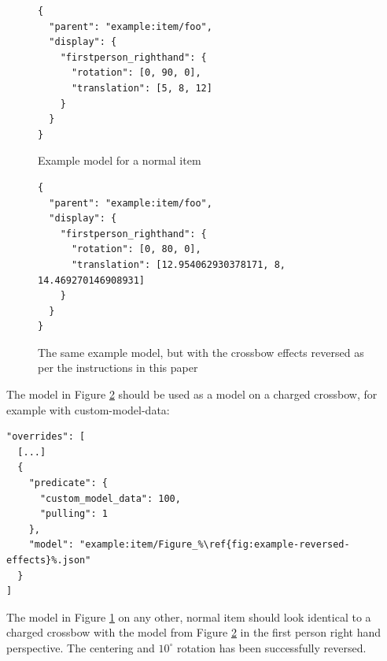 \documentclass{article}
\begin{document}
\begin{figure}[h]
    \centering
    \begin{lstlisting}
{
  "parent": "example:item/foo",
  "display": {
    "firstperson_righthand": {
      "rotation": [0, 90, 0],
      "translation": [5, 8, 12]
    }
  }
}
    \end{lstlisting}
    \caption{Example model for a normal item}
    \label{fig:example-normal}
\end{figure}

\begin{figure}[h]
    \centering
    \begin{lstlisting}
{
  "parent": "example:item/foo",
  "display": {
    "firstperson_righthand": {
      "rotation": [0, 80, 0],
      "translation": [12.954062930378171, 8, 14.469270146908931]
    }
  }
}
    \end{lstlisting}
    \caption{The same example model, but with the crossbow effects reversed as per the instructions in this paper}
    \label{fig:example-reversed-effects}
\end{figure}

The model in Figure \ref{fig:example-reversed-effects} should be used as a model on a charged crossbow, for example with custom-model-data:
\begin{lstlisting}[escapechar=\%]
"overrides": [
  [...]
  {
    "predicate": {
      "custom_model_data": 100,
      "pulling": 1
    },
    "model": "example:item/Figure_%\ref{fig:example-reversed-effects}%.json"
  }
]
\end{lstlisting}

The model in Figure \ref{fig:example-normal} on any other, normal item should look identical to a charged crossbow with the model from Figure \ref{fig:example-reversed-effects} in the first person right hand perspective. The centering and $10^{\circ}$ rotation has been successfully reversed.
\end{document}
